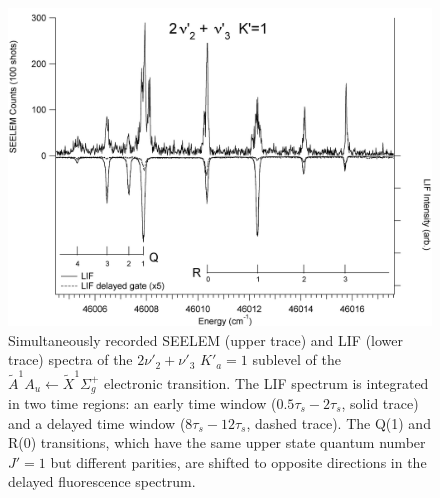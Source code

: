 \documentclass[12pt]{mitthesis}
\begin{document}
\begin{figure}
  \caption{Simultaneously recorded SEELEM (upper trace) and LIF (lower
    trace) spectra of the $2\nu'_2+\nu'_3$ $K'_a\!=\!1$ sublevel of the
    $\tilde{A}^1A_u \leftarrow \tilde{X} ^1\Sigma_g^+$ electronic
    transition.  The LIF spectrum is integrated in two time regions:
    an early time window ($0.5\tau_s-2\tau_s$, solid trace) and a
    delayed time window ($8\tau_s-12\tau_s$, dashed trace).  The Q(1)
    and R(0) transitions, which have the same upper state quantum
    number $J'=1$ but different parities, are shifted to opposite
    directions in the delayed fluorescence spectrum.}
  \label{fig:spectrum-2231}
  \centering
  \vspace{1cm}
  \includegraphics[width=7in,angle=90]{acetylene-2231-q4r3.png}
\end{figure}
\end{document}
